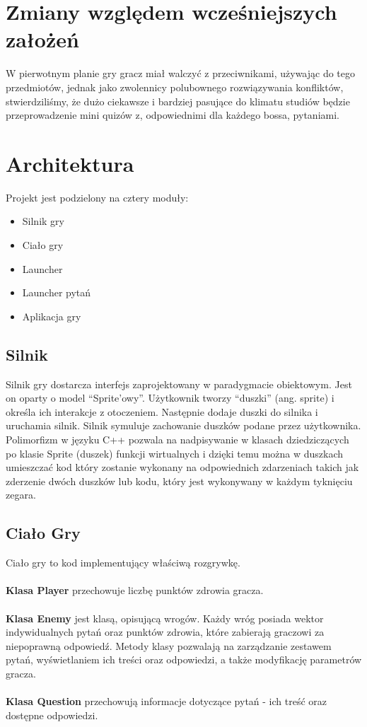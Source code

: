 \documentclass[12pt, titlepage]{article}
\begin{document}
\section{Zmiany względem wcześniejszych założeń}
W pierwotnym planie gry gracz miał walczyć z przeciwnikami, używając do tego przedmiotów, jednak jako zwolennicy polubownego rozwiązywania konfliktów, stwierdziliśmy, że dużo ciekawsze i bardziej pasujące do klimatu studiów będzie przeprowadzenie mini quizów z, odpowiednimi dla każdego bossa, pytaniami. 

\section{Architektura}
Projekt jest podzielony na cztery moduły:
\begin{itemize}
	\item Silnik gry
	\item Ciało gry
	\item Launcher
        \item Launcher pytań
	\item Aplikacja gry
\end{itemize}

\subsection{Silnik}
Silnik gry dostarcza interfejs zaprojektowany w
paradygmacie obiektowym. Jest on oparty o model
"`Sprite'owy"'. Użytkownik tworzy "`duszki"' (ang.
sprite) i określa ich interakcje z otoczeniem.
Następnie dodaje duszki do silnika i uruchamia
silnik. Silnik symuluje zachowanie duszków
podane przez użytkownika. Polimorfizm w języku C++
pozwala na
nadpisywanie w klasach dziedziczących po klasie
Sprite (duszek) funkcji wirtualnych i dzięki temu
można w duszkach umieszczać kod który zostanie
wykonany na odpowiednich zdarzeniach takich jak
zderzenie dwóch duszków lub kodu, który jest
wykonywany w każdym tyknięciu zegara.

\subsection{Ciało Gry}
Ciało gry to kod implementujący właściwą
rozgrywkę.
\\~\\
\textbf{Klasa Player} przechowuje
liczbę punktów zdrowia gracza.
\\~\\
\textbf{Klasa Enemy} jest klasą, opisującą wrogów. Każdy wróg posiada 
wektor indywidualnych pytań oraz punktów zdrowia, które zabierają graczowi za niepoprawną
odpowiedź. Metody klasy
pozwalają na zarządzanie zestawem pytań, wyświetlaniem ich treści oraz odpowiedzi, a także 
modyfikację parametrów gracza.
\\~\\
\textbf{Klasa Question} przechowują informacje dotyczące pytań - ich treść oraz dostępne odpowiedzi.
\end{document}
